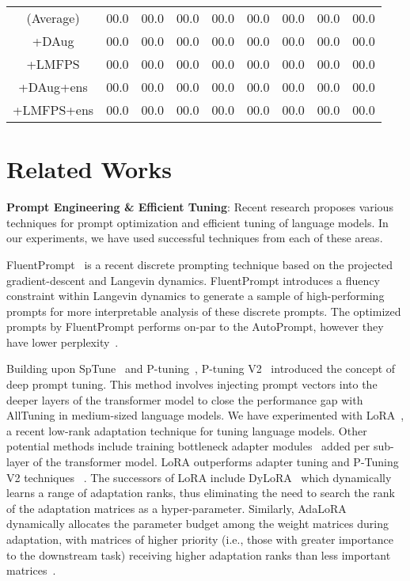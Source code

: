 \documentclass[11pt]{article}
\begin{document}
\begin{table*}
\begin{tabular}{c | c | c | c | c | c | c | c | c}
\hline
\hline
(Average) & \small00.0 & \small00.0 & \small00.0 & \small00.0 & \small00.0 & \small00.0 & \small00.0 & \small00.0\\
\small+DAug & \small00.0 & \small00.0 & \small00.0 & \small00.0 & \small00.0 & \small00.0 & \small00.0 & \small00.0\\
\small+LMFPS & \small00.0 & \small00.0 & \small00.0 & \small00.0 & \small00.0 & \small00.0 & \small00.0 & \small00.0\\
\small+DAug+ens & \small00.0 & \small00.0 & \small00.0 & \small00.0 & \small00.0 & \small00.0 & \small00.0 & \small00.0\\
\small+LMFPS+ens  & \small00.0 & \small00.0 & \small00.0 & \small00.0 & \small00.0 & \small00.0 & \small00.0 & \small00.0\\
\hline
\end{tabular}
\label{lmfps-vs-dataaug-vs-main-32-shot}
\end{table*}

\section{Related Works}

\noindent
{\bf Prompt Engineering \& Efficient Tuning}: Recent research proposes various techniques for prompt optimization and efficient tuning of language models. In our experiments, we have used successful techniques from each of these areas.

FluentPrompt~\cite{shi2022human} is a recent discrete prompting technique based on the projected gradient-descent and Langevin dynamics. FluentPrompt introduces a fluency constraint within Langevin dynamics to generate a sample of high-performing prompts for more interpretable analysis of these discrete prompts. The optimized prompts by FluentPrompt performs on-par to the AutoPrompt, however they have lower perplexity~\cite{shi2022human}.

Building upon SpTune~\cite{lester-etal-2021-power} and P-tuning~\cite{li-liang-2021-prefix}, P-tuning V2~\cite{liu-etal-2022-p} introduced the concept of deep prompt tuning. This method involves injecting prompt vectors into the deeper layers of the transformer model to close the performance gap with AllTuning in medium-sized language models. We have experimented with LoRA~\cite{DBLP:journals/corr/abs-2106-09685}, a recent low-rank adaptation technique for tuning language models. Other potential methods include training bottleneck adapter modules~\cite{DBLP:journals/corr/abs-1902-00751, lin-etal-2020-exploring} added per sub-layer of the transformer model. LoRA outperforms adapter tuning and P-Tuning V2 techniques ~\cite{DBLP:journals/corr/abs-2106-09685}. The successors of LoRA include DyLoRA~\cite{valipour-etal-2023-dylora}  which dynamically learns a range of adaptation ranks, thus eliminating the need to search the rank of the adaptation matrices as a hyper-parameter. Similarly, AdaLoRA dynamically allocates the parameter budget among the weight matrices during adaptation, with matrices of higher priority (i.e., those with greater importance to the downstream task) receiving higher adaptation ranks than less important matrices~\cite{zhang2023adaptive}.
\end{document}
